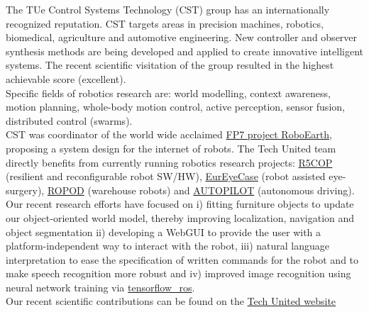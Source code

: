 The TUe Control Systems Technology (CST) group has an internationally recognized reputation. CST targets areas in precision machines, robotics, biomedical, agriculture and automotive engineering. New controller and observer synthesis methods are being developed and applied to create innovative intelligent systems. The recent scientific visitation of the group resulted in the highest achievable score (excellent).
\\
Specific fields of robotics research are: world modelling, context awareness, motion planning, whole-body motion control, active perception, sensor fusion, distributed control (swarms).
\\
CST was coordinator of the world wide acclaimed \href{http://roboearth.ethz.ch/}{FP7 project RoboEarth}, proposing a system design for the internet of robots. The Tech United team directly benefits from currently running robotics research projects: \href{http://www.r5-cop.eu/en/}{R5COP} (resilient and reconfigurable robot SW/HW), \href{https://www.eureyecase.eu/}{EurEyeCase} (robot assisted eye-surgery), \href{http://cordis.europa.eu/project/rcn/206247_en.html}{ROPOD} (warehouse robots) and \href{http://cordis.europa.eu/project/rcn/201768_en.html}{AUTOPILOT} (autonomous driving).
\\
Our recent research efforts have focused on i) fitting furniture objects to update our object-oriented world model, thereby improving localization, navigation and object segmentation ii) developing a WebGUI to provide the user with a platform-independent way to interact with the robot, iii) natural language interpretation to ease the specification of written commands for the robot and to make speech recognition more robust and iv) improved image recognition using neural network training via \href{https://github.com/tue-robotics/image_recognition/tree/master/tensorflow_ros}{tensorflow\_ros}.
\\
Our recent scientific contributions can be found on the \href{http://www.techunited.nl/en/artikel}{Tech United website}
